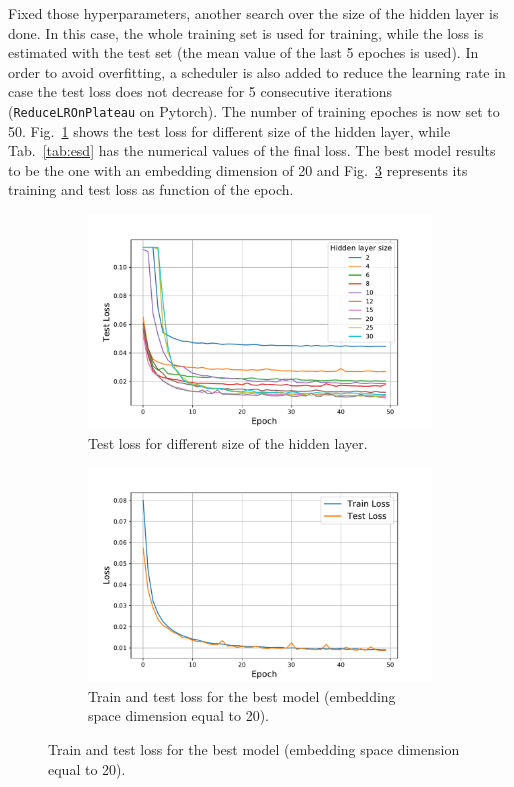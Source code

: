 \documentclass[a4paper,11pt]{article}
\begin{document}
Fixed those hyperparameters, another search over the size of the hidden layer is done. In this case, the whole training set is used for training, while the loss is estimated with the test set (the mean value of the last 5 epoches is used). In order to avoid overfitting, a scheduler is also added to reduce the learning rate in case the test loss does not decrease for 5 consecutive iterations (\texttt{ReduceLROnPlateau} on Pytorch). The number of training epoches is now set to 50. Fig.~\ref{fig:hidden_loss} shows the test loss for different size of the hidden layer, while Tab.~\ref{tab:esd} has the numerical values of the final loss. The best model results to be the one with an embedding dimension of 20 and Fig.~\ref{fig:train-test_loss} represents its training and test loss as function of the epoch.

\begin{figure}[htp]
  \centering
  \caption{}
  \begin{subfigure}[t]{.45\linewidth}
    \includegraphics[width=\linewidth]{../hidden_loss.pdf}
    \caption{Test loss for different size of the hidden layer.}
    \label{fig:hidden_loss}
  \end{subfigure}
  \begin{subfigure}[t]{.45\linewidth}
    \includegraphics[width=\linewidth]{../train-test_loss_best.pdf}
    \caption{Train and test loss for the best model (embedding space dimension equal to 20).}
    \label{fig:train-test_loss}
  \end{subfigure}
\end{figure}
\end{document}

